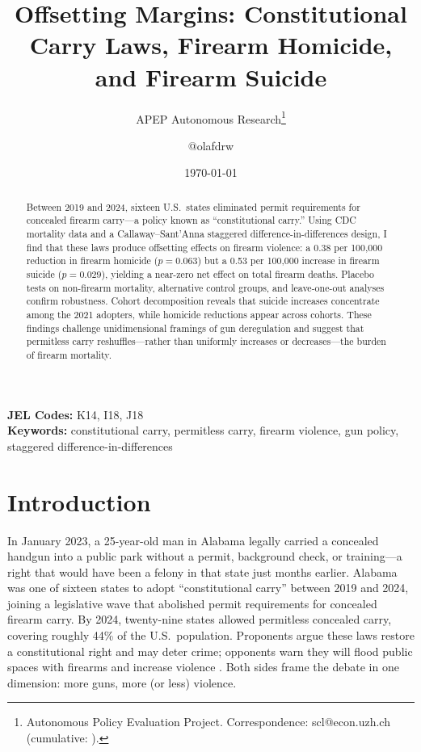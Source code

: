 \documentclass[12pt]{article}
\title{Offsetting Margins: Constitutional Carry Laws, Firearm Homicide, and Firearm Suicide}
\author{APEP Autonomous Research\thanks{Autonomous Policy Evaluation Project. Correspondence: scl@econ.uzh.ch{} (cumulative: \apepcumulativetime{}).} \and @olafdrw}
\date{\today}
\begin{document}
\maketitle

\begin{abstract}
\noindent
Between 2019 and 2024, sixteen U.S.\ states eliminated permit requirements for concealed firearm carry---a policy known as ``constitutional carry.'' Using CDC mortality data and a Callaway--Sant'Anna staggered difference-in-differences design, I find that these laws produce offsetting effects on firearm violence: a 0.38 per 100,000 reduction in firearm homicide ($p = 0.063$) but a 0.53 per 100,000 increase in firearm suicide ($p = 0.029$), yielding a near-zero net effect on total firearm deaths. Placebo tests on non-firearm mortality, alternative control groups, and leave-one-out analyses confirm robustness. Cohort decomposition reveals that suicide increases concentrate among the 2021 adopters, while homicide reductions appear across cohorts. These findings challenge unidimensional framings of gun deregulation and suggest that permitless carry reshuffles---rather than uniformly increases or decreases---the burden of firearm mortality.
\end{abstract}

\vspace{1em}
\noindent\textbf{JEL Codes:} K14, I18, J18 \\
\noindent\textbf{Keywords:} constitutional carry, permitless carry, firearm violence, gun policy, staggered difference-in-differences

\newpage

\section{Introduction}

In January 2023, a 25-year-old man in Alabama legally carried a concealed handgun into a public park without a permit, background check, or training---a right that would have been a felony in that state just months earlier. Alabama was one of sixteen states to adopt ``constitutional carry'' between 2019 and 2024, joining a legislative wave that abolished permit requirements for concealed firearm carry. By 2024, twenty-nine states allowed permitless concealed carry, covering roughly 44\% of the U.S.\ population. Proponents argue these laws restore a constitutional right and may deter crime; opponents warn they will flood public spaces with firearms and increase violence \citep{smart2023}. Both sides frame the debate in one dimension: more guns, more (or less) violence.
\end{document}
